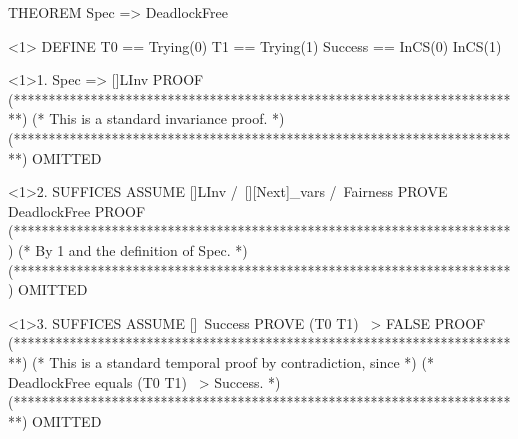 \documentclass[fleqn,leqno]{article}
\begin{document}
\begin{verbatim*}
THEOREM Spec => DeadlockFree

<1> DEFINE T0 == Trying(0)
           T1 == Trying(1)
           Success == InCS(0) \/ InCS(1)

<1>1. Spec => []LInv                                                          PROOF
  (*************************************************************************)
  (* This is a standard invariance proof.                                  *)
  (*************************************************************************) OMITTED

<1>2. SUFFICES ASSUME []LInv /\ [][Next]_vars /\ Fairness 
               PROVE  DeadlockFree                                            PROOF
    (***********************************************************************)
    (* By 1 and the definition of Spec.                                    *)
    (***********************************************************************) OMITTED

<1>3. SUFFICES ASSUME []~Success
               PROVE  (T0 \/ T1) ~> FALSE                                     PROOF
  (*************************************************************************)
  (* This is a standard temporal proof by contradiction, since             *)
  (* DeadlockFree equals (T0 \/ T1) ~> Success.                            *)
  (*************************************************************************) OMITTED
  

\end{verbatim*}
\end{document}

